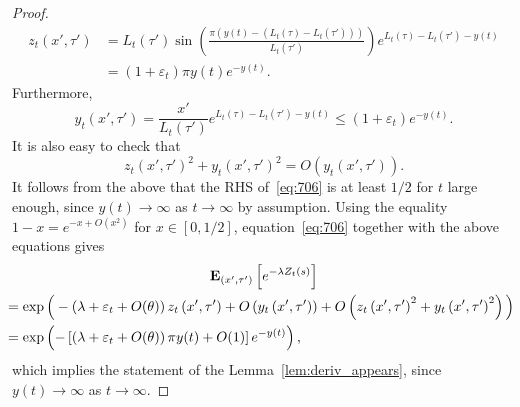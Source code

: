 \documentclass[10pt]{amsart}
\theoremstyle{definition}\newtheorem{defi}[theo]{Definition}\newtheorem{rema}[theo]{Remark}\newtheorem{exam}[theo]{Example}\newtheorem{exem}[theo]{Example}\newtheorem{nota}[theo]{Notation}
\newcommand*\eps{\varepsilon}
\newcommand*\E{\mathbf{E}}
\newcommand{\1} {\mathds{1}}
\renewcommand*\to{\rightarrow}
\begin{document}
\begin{proof}
\begin{align*}
z_t(x',\tau') &= L_t(\tau') \sin\left(\frac{\pi (y(t) - (L_t(\tau) - L_t(\tau')))}{L_t(\tau')}\right) e^{L_t(\tau) - L_t(\tau') - y(t)} \\
&= (1+\eps_t)\pi y(t)e^{-y(t)}.
\end{align*}
Furthermore,
\[
y_t\left(x',\tau'\right) = \frac{x'}{L_t(\tau')} e^{L_t(\tau) - L_t(\tau') - y(t)} \le (1 + \eps_t) e^{-y(t)}.
\]
It is also easy to check that
\[
z_t\left(x',\tau'\right)^2 + y_t\left(x',\tau'\right)^2 = O\left(y_t\left(x',\tau'\right)\right).
\]
It follows from the above that the RHS of~\eqref{eq:706} is at least $1/2$ for $t$ large enough, since $y(t) \to\infty$ as $t\to\infty$ by assumption. Using the equality $1-x = e^{-x + O(x^2)}$ for $x\in [0,1/2]$, equation~\eqref{eq:706} together with the above equations gives
\begin{multline}
\E_{\left(x',\tau'\right)}\left[e^{-\lambda Z_t(s)}\right]\\
\mkern-15mu\begin{aligned}
&= \exp\Big(-\left(\lambda +\eps_t+O(\theta)\right) z_t\left(x',\tau'\right) 
 + O\left(y_t\left(x',\tau'\right)\right) + O\left(z_t\left(x',\tau'\right)^2+y_t\left(x',\tau'\right)^2\right)\Big)\\
&= \exp\left(-\left[\left(\lambda +\eps_t+O(\theta)\right) \pi y(t) + O(1)\right]e^{-y(t)}\right),
\end{aligned}
\end{multline}
which implies the statement of the Lemma~\ref{lem:deriv_appears}, since $y(t)\to\infty$ as $t\to\infty$.
\end{proof}
\end{document}
